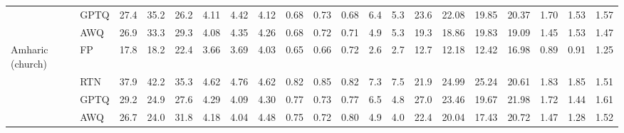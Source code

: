 \begin{landscape}
\begin{longtable}{llrrrrrrrrrrrrrrrrrr}
 & GPTQ & \cellcolor{loss!1}27.4 & \cellcolor{loss!1}35.2 & \cellcolor{loss!1}26.2 & \cellcolor{loss!9}4.11 & \cellcolor{loss!12}4.42 & \cellcolor{loss!6}4.12 & \cellcolor{loss!8}0.68 & \cellcolor{loss!10}0.73 & \cellcolor{loss!5}0.68 & \cellcolor{loss!0}6.4 & \cellcolor{loss!0}5.3 & \cellcolor{loss!0}23.6 & \cellcolor{loss!52}22.08 & \cellcolor{loss!25}19.85 & \cellcolor{loss!23}20.37 & \cellcolor{loss!46}1.70 & \cellcolor{loss!22}1.53 & \cellcolor{loss!21}1.57 \\
 & AWQ & \cellcolor{loss!1}26.9 & \cellcolor{loss!1}33.3 & \cellcolor{loss!1}29.3 & \cellcolor{loss!8}4.08 & \cellcolor{loss!10}4.35 & \cellcolor{loss!11}4.26 & \cellcolor{loss!8}0.68 & \cellcolor{loss!8}0.72 & \cellcolor{loss!9}0.71 & \cellcolor{loss!0}4.9 & \cellcolor{loss!0}5.3 & \cellcolor{loss!0}19.3 & \cellcolor{loss!36}18.86 & \cellcolor{loss!25}19.83 & \cellcolor{loss!17}19.09 & \cellcolor{loss!33}1.45 & \cellcolor{loss!22}1.53 & \cellcolor{loss!15}1.47 \\
\midrule
Amharic (church) & FP & 17.8 & 18.2 & 22.4 & 3.66 & 3.69 & 4.03 & 0.65 & 0.66 & 0.72 & 2.6 & 2.7 & 12.7 & 12.18 & 12.42 & 16.98 & 0.89 & 0.91 & 1.25 \\
 & RTN & \cellcolor{loss!3}37.9 & \cellcolor{loss!3}42.2 & \cellcolor{loss!2}35.3 & \cellcolor{loss!31}4.62 & \cellcolor{loss!35}4.76 & \cellcolor{loss!19}4.62 & \cellcolor{loss!28}0.82 & \cellcolor{loss!32}0.85 & \cellcolor{loss!17}0.82 & \cellcolor{loss!0}7.3 & \cellcolor{loss!0}7.5 & \cellcolor{loss!0}21.9 & \cellcolor{loss!60}24.99 & \cellcolor{loss!60}25.24 & \cellcolor{loss!17}20.61 & \cellcolor{loss!51}1.83 & \cellcolor{loss!51}1.85 & \cellcolor{loss!14}1.51 \\
 & GPTQ & \cellcolor{loss!2}29.2 & \cellcolor{loss!1}24.9 & \cellcolor{loss!1}27.6 & \cellcolor{loss!21}4.29 & \cellcolor{loss!13}4.09 & \cellcolor{loss!9}4.30 & \cellcolor{loss!19}0.77 & \cellcolor{loss!12}0.73 & \cellcolor{loss!8}0.77 & \cellcolor{loss!0}6.5 & \cellcolor{loss!0}4.8 & \cellcolor{loss!0}27.0 & \cellcolor{loss!53}23.46 & \cellcolor{loss!34}19.67 & \cellcolor{loss!23}21.98 & \cellcolor{loss!45}1.72 & \cellcolor{loss!29}1.44 & \cellcolor{loss!20}1.61 \\
 & AWQ & \cellcolor{loss!1}26.7 & \cellcolor{loss!1}24.0 & \cellcolor{loss!1}31.8 & \cellcolor{loss!17}4.18 & \cellcolor{loss!12}4.04 & \cellcolor{loss!15}4.48 & \cellcolor{loss!16}0.75 & \cellcolor{loss!10}0.72 & \cellcolor{loss!13}0.80 & \cellcolor{loss!0}4.9 & \cellcolor{loss!0}4.0 & \cellcolor{loss!0}22.4 & \cellcolor{loss!37}20.04 & \cellcolor{loss!23}17.43 & \cellcolor{loss!18}20.72 & \cellcolor{loss!32}1.47 & \cellcolor{loss!20}1.28 & \cellcolor{loss!15}1.52 \\

\end{longtable}
\end{landscape}
